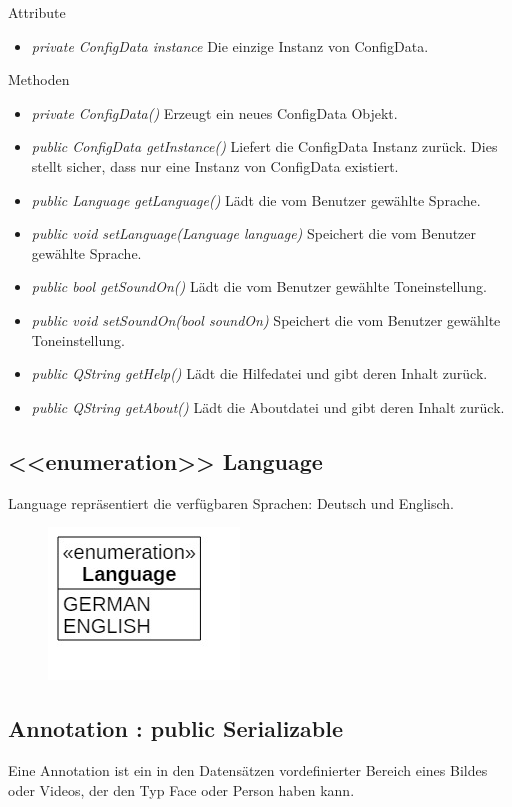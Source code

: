 Attribute
\begin{itemize}
\item\textit{private ConfigData instance} Die einzige Instanz von ConfigData. 
\end{itemize}

Methoden
\begin{itemize}
\item \textit{private ConfigData()} Erzeugt ein neues ConfigData Objekt.
\item \textit{public ConfigData getInstance()} Liefert die ConfigData Instanz zurück. Dies stellt sicher, dass nur eine Instanz von ConfigData existiert.
\item \textit{public Language getLanguage()} Lädt die vom Benutzer gewählte Sprache.
\item \textit{public void setLanguage(Language language)} Speichert die vom Benutzer gewählte Sprache.
\item \textit{public bool getSoundOn()} Lädt die vom Benutzer gewählte Toneinstellung.
\item \textit{public void setSoundOn(bool soundOn)} Speichert die vom Benutzer gewählte Toneinstellung.
\item \textit{public QString getHelp()} Lädt die Hilfedatei und gibt deren Inhalt zurück.
\item \textit{public QString getAbout()} Lädt die Aboutdatei und gibt deren Inhalt zurück.
\end{itemize}

\subsection*{<<enumeration>> Language}
Language repräsentiert die verfügbaren Sprachen: Deutsch und Englisch.

\begin{figure}[H]
\centering
\includegraphics[scale=0.5]{img/Klassendiagramm/Klassen/Model/Language}
\label{fig:language}
\end{figure}

\subsection*{Annotation : public Serializable}
Eine Annotation ist ein in den Datensätzen vordefinierter Bereich eines Bildes oder Videos, der den Typ Face oder Person haben kann.

